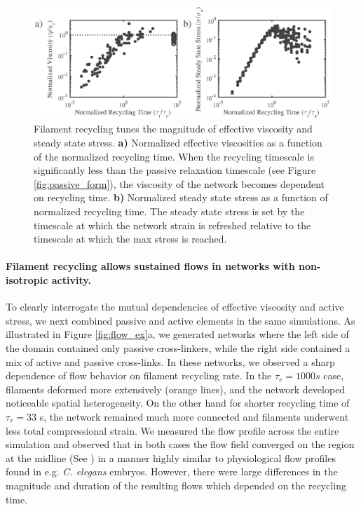 \documentclass[10pt,letterpaper]{article}
\begin{document}
\begin{figure}[h!]
\centering
\includegraphics[width=\hsize]{figures/figure5S}
\caption{\label{fig:rec_form}  Filament recycling tunes the magnitude of effective viscosity and steady state stress. \textbf{a)}  Normalized effective viscosities as a function of the normalized recycling time. When the recycling timescale is significantly less than the passive relaxation timescale (see Figure \ref{fig:passive_form}), the viscosity of the network becomes dependent on recycling time.  \textbf{b)} Normalized steady state stress as a function of normalized recycling time.  The steady state stress is set by the timescale at which the network strain is refreshed relative to the timescale at which the max stress is reached. }
\end{figure}


\paragraph{Filament recycling allows sustained flows in networks with non-isotropic activity.}
To clearly interrogate the mutual dependencies of effective viscosity and active stress, we next combined passive and active elements in the same simulations.  As illustrated in Figure \ref{fig:flow_ex}a, we generated networks where the left side of the domain contained only passive cross-linkers, while the right side contained a mix of active and passive cross-links.  In these networks, we observed a sharp dependence of flow behavior on filament recycling rate.  In the $\tau_r=1000 s$ case, filaments deformed more extensively (orange lines), and the network developed noticeable spatial heterogeneity.  On the other hand for shorter recycling time of $\tau_r=33$ s, the network remained much more connected and filaments underwent less total compressional strain.  We measured the flow profile across the entire simulation and observed that in both cases the flow field converged on the region at the midline (See ) in a manner highly similar to physiological flow profiles found in e.g. \textit{C. elegans} embryos.  However, there were large differences in the magnitude and duration of the resulting flows which depended on the recycling time.
\end{document}

